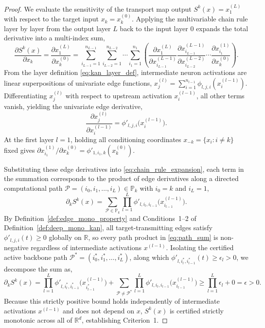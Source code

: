 \documentclass[11pt,a4paper]{article}
\theoremstyle{plain}
\theoremstyle{definition}
\theoremstyle{remark}
\begin{document}
\begin{proof}
We evaluate the sensitivity of the transport map output $S^k(x) = x^{(L)}_1$ with respect to the target input $x_k = x^{(0)}_k$. Applying the multivariable chain rule layer by layer from the output layer $L$ back to the input layer $0$ expands the total derivative into a multi-index sum,
\begin{equation}
    \frac{\partial S^k(x)}{\partial x_k} = \frac{\partial x^{(L)}_1}{\partial x^{(0)}_k} = \sum_{i_{L-1}=1}^{n_{L-1}} \sum_{i_{L-2}=1}^{n_{L-2}} \cdots \sum_{i_1=1}^{n_1} \left( \frac{\partial x^{(L)}_1}{\partial x^{(L-1)}_{i_{L-1}}} \frac{\partial x^{(L-1)}_{i_{L-1}}}{\partial x^{(L-2)}_{i_{L-2}}} \cdots \frac{\partial x^{(1)}_{i_1}}{\partial x^{(0)}_k} \right).
    \label{eq:chain_rule_expansion}
\end{equation}
From the layer definition \eqref{eq:kan_layer_def}, intermediate neuron activations are linear superpositions of univariate edge functions, $x^{(l)}_j = \sum_{i=1}^{n_{l-1}} \phi_{l, j, i}(x^{(l-1)}_i)$. Differentiating $x^{(l)}_j$ with respect to upstream activation $x^{(l-1)}_i$, all other terms vanish, yielding the univariate edge derivative,
\begin{equation}
    \frac{\partial x^{(l)}_j}{\partial x^{(l-1)}_i} = \phi'_{l, j, i}\big(x^{(l-1)}_i\big).
\end{equation}
At the first layer $l=1$, holding all conditioning coordinates $x_{-k} = \{x_i : i \neq k\}$ fixed gives $\partial x^{(1)}_{i_1} / \partial x^{(0)}_k = \phi'_{1, i_1, k}(x^{(0)}_k)$.

Substituting these edge derivatives into \eqref{eq:chain_rule_expansion}, each term in the summation corresponds to the product of edge derivatives along a directed computational path $\mathcal{P} = (i_0, i_1, \dots, i_L) \in \mathbb{P}_k$ with $i_0 = k$ and $i_L = 1$,
\begin{equation}
    \partial_k S^k(x) = \sum_{\mathcal{P} \in \mathbb{P}_k} \prod_{l=1}^L \phi'_{l, i_l, i_{l-1}}\big(x^{(l-1)}_{i_{l-1}}\big).
    \label{eq:path_sum}
\end{equation}
By Definition~\ref{def:edge_mono_property} and Conditions~1--2 of Definition~\ref{def:deep_mono_kan}, all target-transmitting edges satisfy $\phi'_{l, j, i}(t) \ge 0$ globally on $\mathbb{R}$, so every path product in \eqref{eq:path_sum} is non-negative regardless of intermediate activations $x^{(l-1)}$. Isolating the certified active backbone path $\mathcal{P}^* = (i_0^*, i_1^*, \dots, i_L^*)$, along which $\phi'_{l, i_l^*, i_{l-1}^*}(t) \ge \epsilon_l > 0$, we decompose the sum as,
\begin{equation}
    \partial_k S^k(x) = \prod_{l=1}^L \phi'_{l, i_l^*, i_{l-1}^*}\big(x^{(l-1)}_{i_{l-1}^*}\big) + \sum_{\mathcal{P} \neq \mathcal{P}^*} \prod_{l=1}^L \phi'_{l, i_l, i_{l-1}}\big(x^{(l-1)}_{i_{l-1}}\big) \ge \prod_{l=1}^L \epsilon_l + 0 = \epsilon > 0.
\end{equation}
Because this strictly positive bound holds independently of intermediate activations $x^{(l-1)}$ and does not depend on $x$, $S^k(x)$ is certified strictly monotonic across all of $\mathbb{R}^d$, establishing Criterion~1.


\end{proof}
\end{document}
